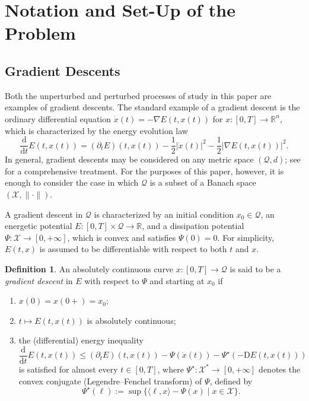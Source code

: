 \documentclass[reqno]{amsart}
\theoremstyle{definition}
\newtheorem{definition}[theorem]{Definition}
\begin{document}
\section{Notation and Set-Up of the Problem}
\label{sec:notation}

\subsection{Gradient Descents}

Both the unperturbed and perturbed processes of study in this paper are examples of gradient descents.  The standard example of a gradient descent is the ordinary differential equation $\dot{x}(t) = - \nabla E(t, x(t))$ for $x \colon [0, T] \to {\mathbb{R}}^{n}$, which is characterized by the energy evolution law
\begin{equation}
	\label{eq:E_diff_classical}
	\frac{\mathrm{d}}{{\mathrm{d}} t} E(t, x(t)) = (\partial_{t} E)(t, x(t)) - \frac{1}{2} | \dot{x}(t) |^{2} - \frac{1}{2} | \nabla E(t, x(t)) |^{2}.
\end{equation}
In general, gradient descents may be considered on any metric space $(\mathcal{Q}, d)$;  see \cite{AmbrosioGigliSavare:2008} for a comprehensive treatment.  For the purposes of this paper, however, it is enough to consider the case in which $\mathcal{Q}$ is a subset of a Banach space $(\mathcal{X}, \| \cdot \|)$.

A gradient descent in $\mathcal{Q}$ is characterized by an initial condition $x_{0} \in \mathcal{Q}$, an energetic potential $E \colon [0, T] \times \mathcal{Q} \to {\mathbb{R}}$, and a dissipation potential $\Psi \colon \mathcal{X} \to [0, +\infty]$, which is convex and satisfies $\Psi(0) = 0$.  For simplicity, $E(t, x)$ is assumed to be differentiable with respect to both $t$ and $x$.

\begin{definition}
	\label{defn:MetGD}
	An absolutely continuous curve $x \colon [0, T] \to \mathcal{Q}$ is said to be a \emph{gradient descent} in $E$ with respect to $\Psi$ and starting at $x_{0}$ if
	\begin{enumerate}
		\item $x(0) = x(0+) = x_{0}$;
		\item $t \mapsto E(t, x(t))$ is absolutely continuous;
		\item the (differential) energy inequality
		\begin{equation}
			\label{eq:E_diff_Banach}
			\frac{\mathrm{d}}{{\mathrm{d}} t} E(t, x(t)) \leq (\partial_{t} E)(t, x(t)) - \Psi ( \dot{x}(t) ) - \Psi^{\star} ( - {\mathrm{D}} E(t, x(t)) )
		\end{equation}
		is satisfied for almost every $t \in [0, T]$, where $\Psi^{\star} \colon \mathcal{X}^{\ast} \to [0, +\infty]$ denotes the convex conjugate (Legendre--Fenchel transform) of $\Psi$, defined by
		\begin{equation}
			\label{eq:convex_conjugate}
			\Psi^{\star}(\ell) := \sup \{ \langle \ell, x \rangle - \Psi(x) \mid x \in \mathcal{X} \}.
		\end{equation}
	\end{enumerate}
\end{definition}
\end{document}
